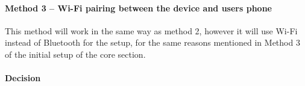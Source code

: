 \paragraph{Method 3 – Wi-Fi pairing between the device and users phone}
This method will work in the same way as method 2, however it will use Wi-Fi instead of Bluetooth for the setup, for the same reasons mentioned in Method 3 of the initial setup of the core section.

\paragraph{Decision}
